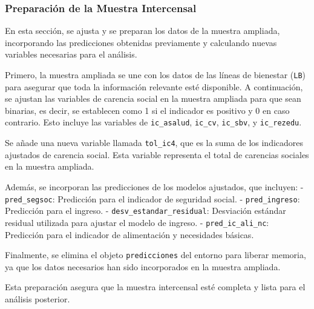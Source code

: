 \documentclass[
  12pt,
]{book}
\begin{document}
\hypertarget{preparaciuxf3n-de-la-muestra-intercensal}{%
\subsubsection*{Preparación de la Muestra Intercensal}\label{preparaciuxf3n-de-la-muestra-intercensal}}

En esta sección, se ajusta y se preparan los datos de la muestra ampliada, incorporando las predicciones obtenidas previamente y calculando nuevas variables necesarias para el análisis.

Primero, la muestra ampliada se une con los datos de las líneas de bienestar (\texttt{LB}) para asegurar que toda la información relevante esté disponible. A continuación, se ajustan las variables de carencia social en la muestra ampliada para que sean binarias, es decir, se establecen como 1 si el indicador es positivo y 0 en caso contrario. Esto incluye las variables de \texttt{ic\_asalud}, \texttt{ic\_cv}, \texttt{ic\_sbv}, y \texttt{ic\_rezedu}.

Se añade una nueva variable llamada \texttt{tol\_ic4}, que es la suma de los indicadores ajustados de carencia social. Esta variable representa el total de carencias sociales en la muestra ampliada.

Además, se incorporan las predicciones de los modelos ajustados, que incluyen:
- \texttt{pred\_segsoc}: Predicción para el indicador de seguridad social.
- \texttt{pred\_ingreso}: Predicción para el ingreso.
- \texttt{desv\_estandar\_residual}: Desviación estándar residual utilizada para ajustar el modelo de ingreso.
- \texttt{pred\_ic\_ali\_nc}: Predicción para el indicador de alimentación y necesidades básicas.

Finalmente, se elimina el objeto \texttt{predicciones} del entorno para liberar memoria, ya que los datos necesarios han sido incorporados en la muestra ampliada.

Esta preparación asegura que la muestra intercensal esté completa y lista para el análisis posterior.
\end{document}
